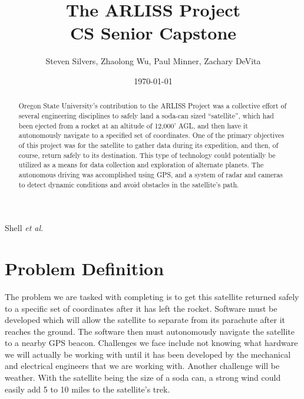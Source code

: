 \documentclass[10pt,onecolumn,draftclsnofoot,journal]{IEEEtran}
\title{The ARLISS Project \\
	\large CS Senior Capstone}
\author{Steven Silvers, Zhaolong Wu, Paul Minner, Zachary DeVita}
\date{\today}
\begin{document}

%
{Shell \MakeLowercase{\textit{et al.}}}

\maketitle

\begin{abstract}
\noindent Oregon State University’s contribution to the ARLISS Project was a collective effort of several engineering disciplines to safely land a soda-can sized “satellite”, which had been ejected from a rocket at an altitude of 12,000’ AGL, and then have it autonomously navigate to a specified set of coordinates. One of the primary objectives of this project was for the satellite to gather data during its expedition, and then, of course, return safely to its destination. This type of technology could potentially be utilized as a means for data collection and exploration of alternate planets. The autonomous driving was accomplished using GPS, and a system of radar and cameras to detect dynamic conditions and avoid obstacles in the satellite’s path.
\end{abstract}


\clearpage

\newpage
{}

\section*{\textbf{Problem Definition}}
\noindent The problem we are tasked with completing is to get this satellite returned safely to a specific set of coordinates after it has left the rocket. Software must be developed which will allow the satellite to separate from its parachute after it reaches the ground. The software then must autonomously navigate the satellite to a nearby GPS beacon. Challenges we face include not knowing what hardware we will actually be working with until it has been developed by the mechanical and electrical engineers that we are working with. Another challenge will be weather. With the satellite being the size of a soda can, a strong wind could easily add 5 to 10 miles to the satellite’s trek.
\end{document}
